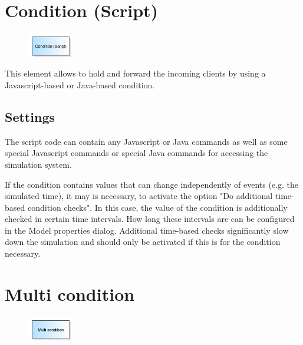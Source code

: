 \section{Condition (Script)}
\label{ref:ModelElementHoldJS}

\begin{figure}
\vspace{-22pt}
\includegraphics[width=2cm]{imageModelElementHoldJS.png}
\vspace{-22pt}
\end{figure}

This element allows to hold and forward the incoming clients by using a
Javascript-based or Java-based condition.

\subsection*{Settings}

The script code can contain any Javascript or Java commands as well as some
special Javascript commands or special Java commands 
for accessing the simulation system.

If the condition contains values that can change independently of events (e.g. the simulated time),
it may is necessary, to activate the option "Do additional time-based condition checks". In this case,
the value of the condition is additionally checked in certain time intervals. How long these intervals
are can be configured in the Model properties dialog.
Additional time-based checks significantly slow down the simulation and should only be activated
if this is for the condition necessary.


\section{Multi condition}
\label{ref:ModelElementHoldMulti}

\begin{figure}
\vspace{-22pt}
\includegraphics[width=2cm]{imageModelElementHoldMulti.png}
\vspace{-22pt}
\end{figure}

